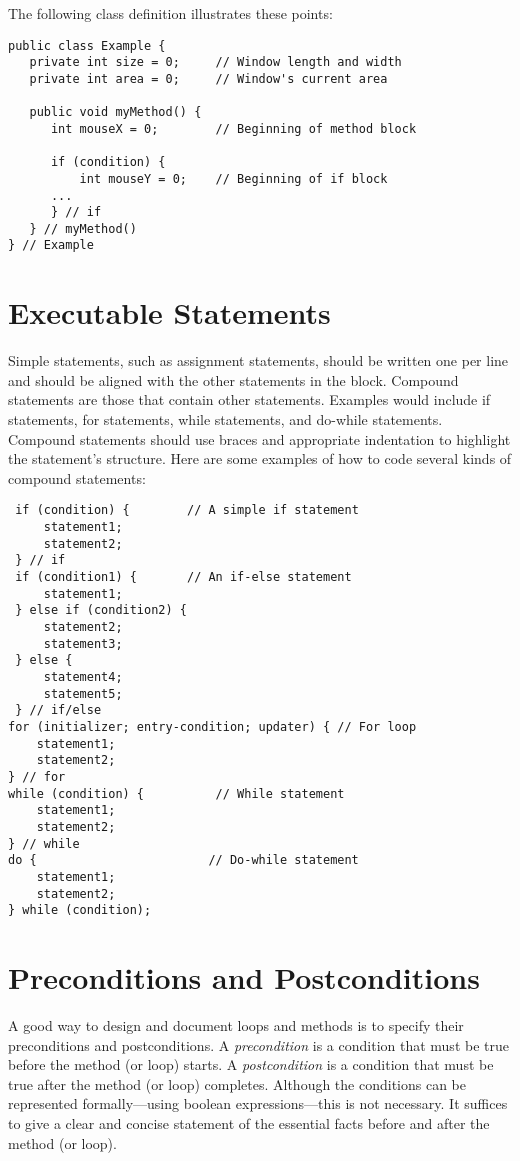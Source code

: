 \noindent The following class definition illustrates these points:

\begin{jjjlisting}
\begin{lstlisting}
public class Example {
   private int size = 0;     // Window length and width
   private int area = 0;     // Window's current area

   public void myMethod() {
      int mouseX = 0;        // Beginning of method block

      if (condition) {
          int mouseY = 0;    // Beginning of if block
      ...
      } // if
   } // myMethod()
} // Example
\end{lstlisting}
\end{jjjlisting}


\section*{Executable Statements}
\label{executable-statements}
\noindent Simple statements, such as assignment statements, should be written
one per line and should be aligned with the other statements in the
block.   Compound statements are those that contain other
statements.  Examples would include if statements, for statements,
while statements, and do-while statements.  Compound statements should
use braces and appropriate indentation to highlight the statement's
structure.  Here are some examples of how to code several kinds of
compound statements:

\begin{jjjlisting}[27pc]
\begin{lstlisting}
 if (condition) {        // A simple if statement
     statement1;
     statement2;
 } // if
 if (condition1) {       // An if-else statement
     statement1;
 } else if (condition2) {
     statement2;
     statement3;
 } else {
     statement4;
     statement5;
 } // if/else
for (initializer; entry-condition; updater) { // For loop
    statement1;
    statement2;
} // for
while (condition) {          // While statement
    statement1;
    statement2;
} // while
do {                        // Do-while statement
    statement1;
    statement2;
} while (condition);
\end{lstlisting}
\end{jjjlisting}

\section*{Preconditions and Postconditions}
\label{preconditionsand-postconditions}
\noindent A good way to design and document loops and methods is to specify
their preconditions and postconditions.  A {\it precondition} is a
condition that must be true before the method (or loop) starts.  A {\it
postcondition} is a condition that must be true after the method (or
loop) completes.   Although the conditions can be represented 
formally---using boolean expressions---this is not necessary.  It suffices
to give a clear and concise statement of the essential facts before
and after the method (or loop).

